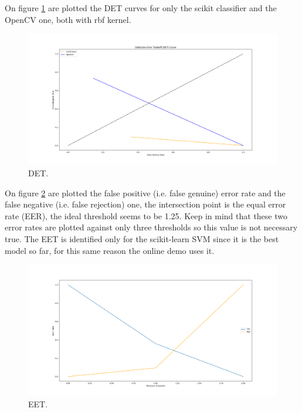 On figure \ref{fig:det} are plotted the DET curves for only the scikit classifier and the OpenCV one, both with rbf kernel. 

\begin{figure}[h!t]
    \centering
    \includegraphics[scale=0.25]{images/det.png}
    \caption{DET.}
    \label{fig:det}
\end{figure}

On figure \ref{fig:eet} are plotted the false positive (i.e. false genuine) error rate and the false negative (i.e. false rejection) one, the intersection point is the equal error rate (EER), the ideal threshold seems to be 1.25.
Keep in mind that these two error rates are plotted against only three thresholds so this value is not necessary true. 
The EET is identified only for the scikit-learn SVM since it is the best model so far, for this same reason the online demo uses it.

\begin{figure}[h!t]
    \centering
    \includegraphics[scale=0.25]{images/eet.png}
    \caption{EET.}
    \label{fig:eet}
\end{figure}
